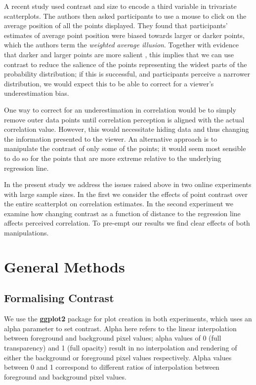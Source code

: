 \documentclass[preprint, 3p,
authoryear]{elsarticle} %
\begin{document}
A recent study \citep{hong_2021} used contrast and size to encode a
third variable in trivariate scatterplots. The authors then asked
participants to use a mouse to click on the average position of all the
points displayed. They found that participants' estimates of average
point position were biased towards larger or darker points, which the
authors term the \emph{weighted average illusion}. Together with
evidence that darker and larger points are more salient
\citep{healey_2012}, this implies that we can use contrast to reduce the
salience of the points representing the widest parts of the probability
distribution; if this is successful, and participants perceive a
narrower distribution, we would expect this to be able to correct for a
viewer's underestimation bias.

One way to correct for an underestimation in correlation would be to
simply remove outer data points until correlation perception is aligned
with the actual correlation value. However, this would necessitate
hiding data and thus changing the information presented to the viewer.
An alternative approach is to manipulate the contrast of only some of
the points; it would seem most sensible to do so for the points that are
more extreme relative to the underlying regression line.

In the present study we address the issues raised above in two online
experiments with large sample sizes. In the first we consider the
effects of point contrast over the entire scatterplot on correlation
estimates. In the second experiment we examine how changing contrast as
a function of distance to the regression line affects perceived
correlation. To pre-empt our results we find clear effects of both
manipulations.

\hypertarget{general-methods}{%
\section{General Methods}\label{general-methods}}

\hypertarget{formalising-contrast}{%
\subsection{Formalising Contrast}\label{formalising-contrast}}

We use the \textbf{ggplot2} \citep{hadley_gg2016} package for plot
creation in both experiments, which uses an alpha parameter to set
contrast. Alpha here refers to the linear interpolation
\citep{stone_2008} between foreground and background pixel values; alpha
values of 0 (full transparency) and 1 (full opacity) result in no
interpolation and rendering of either the background or foreground pixel
values respectively. Alpha values between 0 and 1 correspond to
different ratios of interpolation between foreground and background
pixel values.
\end{document}
